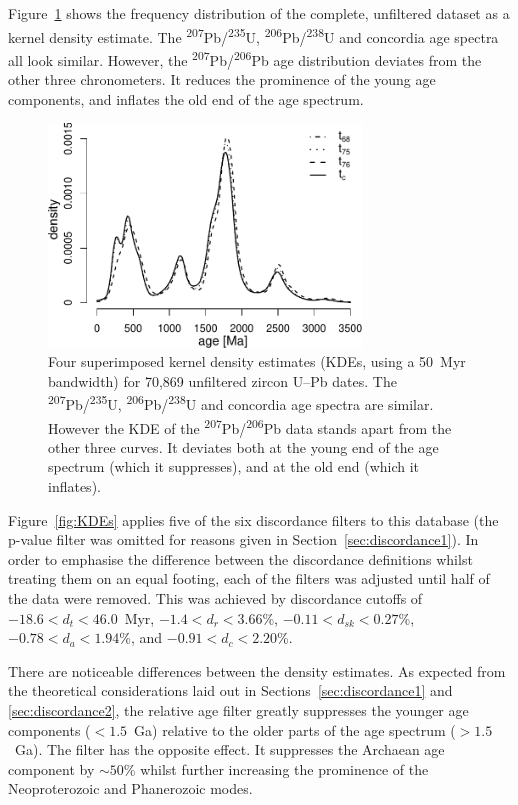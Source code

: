 \documentclass[gchron, manuscript]{copernicus}
\begin{document}
Figure~\ref{fig:KDE} shows the frequency distribution of the complete,
unfiltered dataset as a kernel density estimate. The
\textsuperscript{207}Pb/\textsuperscript{235}U,
\textsuperscript{206}Pb/\textsuperscript{238}U and concordia age
spectra all look similar. However, the
\textsuperscript{207}Pb/\textsuperscript{206}Pb age distribution
deviates from the other three chronometers. It reduces the prominence
of the young age components, and inflates the old end of the age
spectrum.

\begin{figure}[t]
  \includegraphics[width=8.3cm]{KDE.pdf}
  \caption{Four superimposed kernel density estimates (KDEs, using a
    50~Myr bandwidth) for 70,869 unfiltered zircon U--Pb dates. The
    \textsuperscript{207}Pb/\textsuperscript{235}U,
    \textsuperscript{206}Pb/\textsuperscript{238}U and concordia age
    spectra are similar.  However the KDE of the
    \textsuperscript{207}Pb/\textsuperscript{206}Pb data stands apart
    from the other three curves. It deviates both at the young end of
    the age spectrum (which it suppresses), and at the old end (which
    it inflates).  }
  \label{fig:KDE}
\end{figure}

Figure~\ref{fig:KDEs} applies five of the six discordance filters to
this database (the p-value filter was omitted for reasons given in
Section~\ref{sec:discordance1}). In order to emphasise the difference
between the discordance definitions whilst treating them on an equal
footing, each of the filters was adjusted until half of the data were
removed. This was achieved by discordance cutoffs of
$-18.6<d_t<46.0$~Myr, $-1.4<d_r<3.66$\%, $-0.11<d_{sk}<0.27$\%,
$-0.78<d_{a}<1.94$\%, and $-0.91<d_c<2.20$\%.

There are noticeable differences between the density estimates.  As
expected from the theoretical considerations laid out in
Sections~\ref{sec:discordance1} and \ref{sec:discordance2}, the
relative age filter greatly suppresses the younger age components
($<1.5$~Ga) relative to the older parts of the age spectrum
($>1.5$~Ga). The \citet{stacey1975} filter has the opposite effect.
It suppresses the Archaean age component by $\sim{50}$\% whilst
further increasing the prominence of the Neoproterozoic and
Phanerozoic modes.
\end{document}
